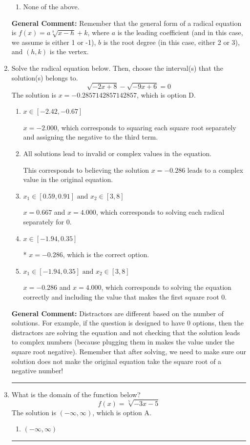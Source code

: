\documentclass{extbook}[14pt]
\newcommand{\litem}[1]{\item #1

\rule{\textwidth}{0.4pt}}
\begin{document}
\begin{enumerate}
{\begin{enumerate}[label=\Alph*.]
\begin{multicols}{2}
\end{multicols}\item None of the above.\end{enumerate}
\textbf{General Comment:} Remember that the general form of a radical equation is $ f(x) = a \sqrt[b]{x - h} + k $, where $a$ is the leading coefficient (and in this case, we assume is either 1 or -1), $b$ is the root degree (in this case, either 2 or 3), and $(h, k)$ is the vertex.
}
\litem{
Solve the radical equation below. Then, choose the interval(s) that the solution(s) belongs to.
\[ \sqrt{-2 x + 8} - \sqrt{-9 x + 6} = 0 \]
The solution is \( x = -0.2857142857142857 \), which is option D.\begin{enumerate}[label=\Alph*.]
\item \( x \in [-2.42,-0.67] \)

$x = -2.000$, which corresponds to squaring each square root separately and assigning the negative to the third term.
\item \( \text{All solutions lead to invalid or complex values in the equation.} \)

This corresponds to believing the solution $x = -0.286$ leads to a complex value in the original equation.
\item \( x_1 \in [0.59, 0.91] \text{ and } x_2 \in [3,8] \)

$x = 0.667$ and $x = 4.000$, which corresponds to solving each radical separately for 0.
\item \( x \in [-1.94,0.35] \)

* $x = -0.286$, which is the correct option.
\item \( x_1 \in [-1.94, 0.35] \text{ and } x_2 \in [3,8] \)

$x = -0.286$ and $x = 4.000$, which corresponds to solving the equation correctly and including the value that makes the first square root 0.
\end{enumerate}

\textbf{General Comment:} Distractors are different based on the number of solutions. For example, if the question is designed to have 0 options, then the distractors are solving the equation and not checking that the solution leads to complex numbers (because plugging them in makes the value under the square root negative). Remember that after solving, we need to make sure our solution does not make the original equation take the square root of a negative number!
}
\litem{
What is the domain of the function below?
\[ f(x) = \sqrt[5]{-3 x - 5} \]
The solution is \( (-\infty, \infty) \), which is option A.\begin{enumerate}[label=\Alph*.]
\item \( (-\infty, \infty) \)


\end{enumerate}}
\end{enumerate}
\end{document}
